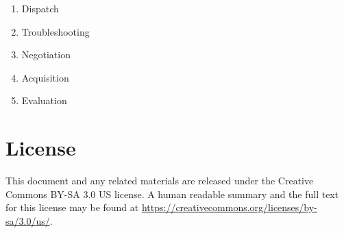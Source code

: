 \documentclass[twocolumn]{article}
\begin{document}
\begin{enumerate}
	\item Dispatch
	\item Troubleshooting
	\item Negotiation
	\item Acquisition
	\item Evaluation
\end{enumerate}

\section*{License}

This document and any related materials are released under the Creative Commons BY-SA 3.0 US license. A human readable summary and the full text for this license may be found at \url{https://creativecommons.org/licenses/by-sa/3.0/us/}.
\end{document}
